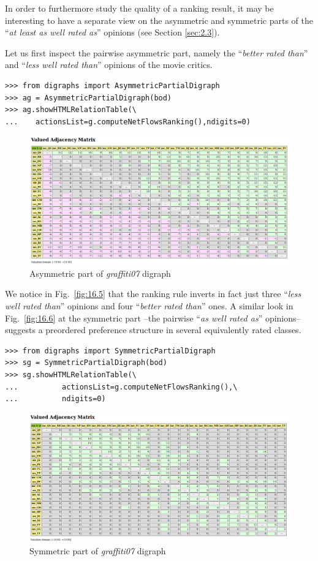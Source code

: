 In order to furthermore study the quality of a ranking result, it may be interesting to have a separate view on the asymmetric and symmetric parts of the ``\emph{at least as well rated as}'' opinions (see Section \vref{sec:2.3}).

Let us first inspect the pairwise asymmetric part, namely the ``\emph{better rated than}'' and ``\emph{less well rated than}'' opinions of the movie critics. 
\begin{lstlisting}
>>> from digraphs import AsymmetricPartialDigraph
>>> ag = AsymmetricPartialDigraph(bod)
>>> ag.showHTMLRelationTable(\
...    actionsList=g.computeNetFlowsRanking(),ndigits=0)
\end{lstlisting}
\begin{figure}[h]
\includegraphics[width=12cm]{Figures/16-5-asymmetricPart.png}
\caption{Asymmetric part of \emph{graffiti07} digraph}
\label{fig:16.5}       %
\end{figure}

We notice in Fig.~\vref{fig:16.5} that the \NetFlows ranking rule inverts in fact just three ``\emph{less well rated than}'' opinions and four ``\emph{better rated than}'' ones. A similar look in Fig.~\vref{fig:16.6} at the symmetric part --the pairwise ``\emph{as well rated as}'' opinions-- suggests a preordered preference structure in several equivalently rated classes. 
\begin{lstlisting}
>>> from digraphs import SymmetricPartialDigraph
>>> sg = SymmetricPartialDigraph(bod)
>>> sg.showHTMLRelationTable(\
...          actionsList=g.computeNetFlowsRanking(),\
...          ndigits=0)
\end{lstlisting}
\begin{figure}[h]
\includegraphics[width=12cm]{Figures/16-6-symmetricPart.png}
\caption{Symmetric part of \emph{graffiti07} digraph}
\label{fig:16.6}       %
\end{figure}


